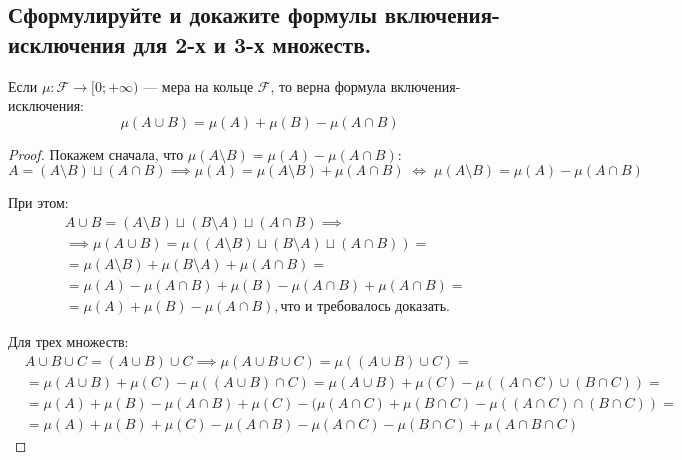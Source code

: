 
\subsection{Сформулируйте и докажите формулы включения-исключения для 2-х и 3-х множеств.}

Если $\mu : \mathcal{F} \to [0; +\infty)$ --- мера на кольце $\mathcal{F}$, то верна формула включения-исключения:
\[ \mu(A \cup B) = \mu(A) + \mu(B) - \mu(A \cap B) \]
\begin{proof}
    Покажем сначала, что $\mu(A \setminus B) = \mu(A) - \mu(A \cap B)$:
    \[ A = (A \setminus B) \sqcup (A \cap B) \implies \mu(A) = \mu(A \setminus B) + \mu(A \cap B) \; 
    \Leftrightarrow \; \mu(A \setminus B) = \mu(A) - \mu(A \cap B) \]

    При этом: 
    \begin{align*}
        & A \cup B = (A \setminus B) \sqcup (B \setminus A) \sqcup (A \cap B) \implies \\[5 pt]
        & \implies \mu(A \cup B) = \mu((A \setminus B) \sqcup (B \setminus A) \sqcup (A \cap B)) = \\[5 pt]
        & = \mu(A \setminus B) + \mu(B \setminus A) + \mu(A \cap B) = \\[5 pt]
        & = \mu(A) - \mu(A \cap B) + \mu(B) - \mu(A \cap B) + \mu(A \cap B) = \\[5 pt]
        & = \mu(A) + \mu(B) - \mu(A \cap B), \text{что и требовалось доказать.}
    \end{align*}

    Для трех множеств:
    \begin{align*}
        & A \cup B \cup C = (A \cup B) \cup C \implies \mu(A \cup B \cup C) = \mu((A \cup B) \cup C) = \\[5 pt]
        & = \mu(A \cup B) + \mu(C) - \mu((A \cup B) \cap C) = \mu(A \cup B) + \mu(C) - \mu((A \cap C) \cup (B \cap C)) = \\[5 pt]
        & = \mu(A) + \mu(B) - \mu(A \cap B) + \mu(C) - (\mu(A \cap C) + \mu(B \cap C) - \mu((A \cap C) \cap (B \cap C)) = \\[5 pt]
        & = \mu(A) + \mu(B) + \mu(C) - \mu(A \cap B) - \mu(A \cap C) - \mu(B \cap C) + \mu(A \cap B \cap C)
    \end{align*}
\end{proof}
